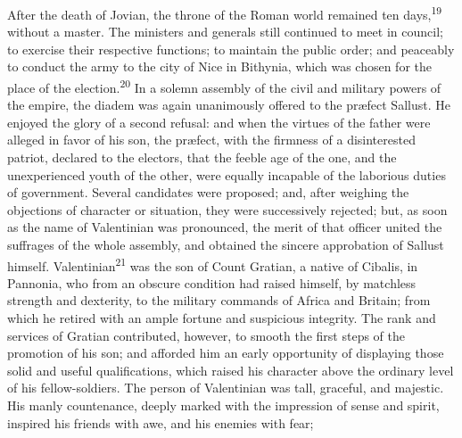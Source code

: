 

After the death of Jovian, the throne of the Roman world remained
ten days,\textsuperscript{19} without a master. The ministers and generals still
continued to meet in council; to exercise their respective
functions; to maintain the public order; and peaceably to conduct
the army to the city of Nice in Bithynia, which was chosen for
the place of the election.\textsuperscript{20} In a solemn assembly of the civil
and military powers of the empire, the diadem was again
unanimously offered to the præfect Sallust. He enjoyed the glory
of a second refusal: and when the virtues of the father were
alleged in favor of his son, the præfect, with the firmness of a
disinterested patriot, declared to the electors, that the feeble
age of the one, and the unexperienced youth of the other, were
equally incapable of the laborious duties of government. Several
candidates were proposed; and, after weighing the objections of
character or situation, they were successively rejected; but, as
soon as the name of Valentinian was pronounced, the merit of that
officer united the suffrages of the whole assembly, and obtained
the sincere approbation of Sallust himself. Valentinian\textsuperscript{21} was
the son of Count Gratian, a native of Cibalis, in Pannonia, who
from an obscure condition had raised himself, by matchless
strength and dexterity, to the military commands of Africa and
Britain; from which he retired with an ample fortune and
suspicious integrity. The rank and services of Gratian
contributed, however, to smooth the first steps of the promotion
of his son; and afforded him an early opportunity of displaying
those solid and useful qualifications, which raised his character
above the ordinary level of his fellow-soldiers. The person of
Valentinian was tall, graceful, and majestic. His manly
countenance, deeply marked with the impression of sense and
spirit, inspired his friends with awe, and his enemies with fear;
